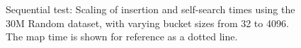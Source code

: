\begin{landscape}
    \begin{figure}[H]
        \caption{Sequential test: Scaling of insertion and self-search times
        using the 30M Random dataset, with varying bucket sizes from 32 to
        4096. The {\keyword map} time is shown for reference as a dotted line.}
        \label{fig:seq_30m}
    \end{figure}
\end{landscape}


